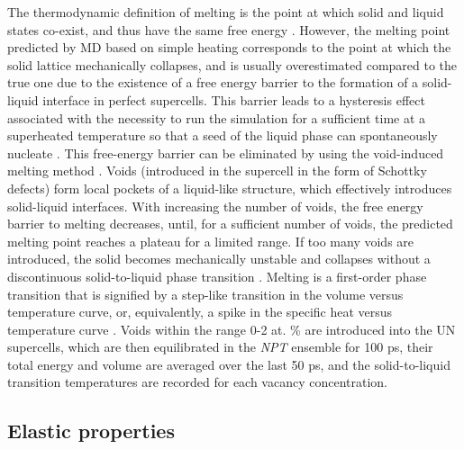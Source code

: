 \documentclass[preprint, 12pt]{elsarticle}
\begin{document}
The thermodynamic definition of melting is the point at which solid and liquid states co-exist, and thus have the same free energy \cite{Alavi2006, Zhang2012}. However, the melting point predicted by MD based on simple heating corresponds to the point at which the solid lattice mechanically collapses, and is usually overestimated compared to the true one due to the existence of a free energy barrier to the formation of a solid-liquid interface in perfect supercells. This barrier leads to a hysteresis effect associated with the necessity to run the simulation for a sufficient time at a superheated temperature so that a seed of the liquid phase can spontaneously nucleate \cite{Ercolessi1997, Alavi2006}. This free-energy barrier can be eliminated by using the void-induced melting method \cite{Alavi2006, Zhang2012}. Voids (introduced in the supercell in the form of Schottky defects) form local pockets of a liquid-like structure, which effectively introduces solid-liquid interfaces. With increasing the number of voids, the free energy barrier to melting decreases, until, for a sufficient number of voids, the predicted melting point reaches a plateau for a limited range. If too many voids are introduced, the solid becomes mechanically unstable and collapses without a discontinuous solid-to-liquid phase transition \cite{Alavi2006}. Melting is a first-order phase transition that is signified by a step-like transition in the volume versus temperature curve, or, equivalently, a spike in the specific heat versus temperature curve \cite{Blundell2010}. Voids within the range 0-2 at. \% are introduced into the UN supercells, which are then equilibrated in the \textit{NPT} ensemble for 100 ps, their total energy and volume are averaged over the last 50 ps, and the solid-to-liquid transition temperatures are recorded for each vacancy concentration. 

\subsection{Elastic properties}
\end{document}
